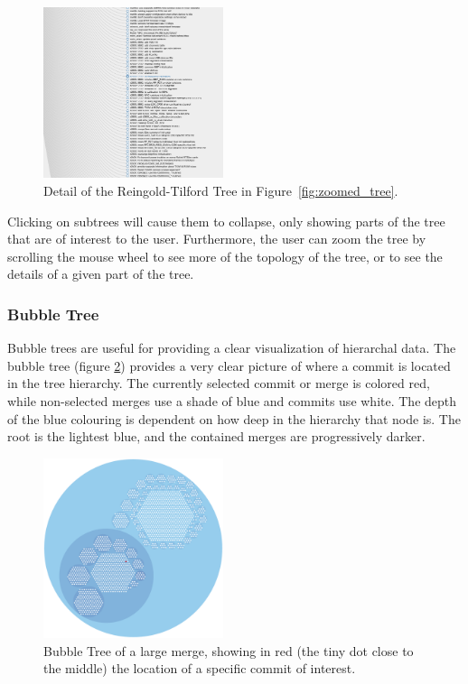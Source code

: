 \documentclass[conference, draftclsnofoot, draft]{IEEEtran}
\begin{document}
\begin{figure}
        \centering
        \includegraphics[width=0.47\textwidth]{figures/tree_view.png}
        \caption{Detail of the Reingold-Tilford Tree in Figure~\ref{fig:zoomed_tree}.}
        \label{fig:tree}
\end{figure}

Clicking on subtrees will cause them to collapse, only showing parts of the tree
that are of interest to the user. Furthermore, the user can zoom the tree by
scrolling the mouse wheel to see more of the topology of the tree, or to see the
details of a given part of the tree.



\subsubsection{Bubble Tree}

Bubble trees are useful for providing a clear visualization of hierarchal
data\cite{Boardman2000}. The bubble tree (figure \ref{fig:bubble_tree}) provides a
very clear picture of where a commit is located in the tree hierarchy. The currently
selected commit or merge is colored red, while non-selected merges use a shade of
blue and commits use white.  The depth of the blue colouring is dependent on how
deep in the hierarchy that node is. The root is the lightest blue, and the contained
merges are progressively darker.

\begin{figure}
        \centering
        \includegraphics[width=0.47\textwidth]{figures/bubble_tree.pdf}
        \caption{Bubble Tree of a large merge, showing in red (the tiny dot close to the middle) the location of a specific commit of interest.}
        \label{fig:bubble_tree}
\end{figure}
\end{document}

